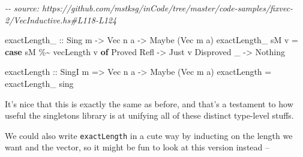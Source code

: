\documentclass[]{article}
\newenvironment{Shaded}{}{}
\newcommand{\CommentTok}[1]{\textcolor[rgb]{0.38,0.63,0.69}{\textit{#1}}}
\newcommand{\DataTypeTok}[1]{\textcolor[rgb]{0.56,0.13,0.00}{#1}}
\newcommand{\KeywordTok}[1]{\textcolor[rgb]{0.00,0.44,0.13}{\textbf{#1}}}
\newcommand{\NormalTok}[1]{#1}
\newcommand{\OperatorTok}[1]{\textcolor[rgb]{0.40,0.40,0.40}{#1}}
\newcommand{\OtherTok}[1]{\textcolor[rgb]{0.00,0.44,0.13}{#1}}
\begin{document}
\begin{Shaded}
\begin{Highlighting}[]
\CommentTok{{-}{-} source: https://github.com/mstksg/inCode/tree/master/code{-}samples/fixvec{-}2/VecInductive.hs\#L118{-}L124}

\OtherTok{exactLength\_ ::} \DataTypeTok{Sing}\NormalTok{ m }\OtherTok{{-}\textgreater{}} \DataTypeTok{Vec}\NormalTok{ n a }\OtherTok{{-}\textgreater{}} \DataTypeTok{Maybe}\NormalTok{ (}\DataTypeTok{Vec}\NormalTok{ m a)}
\NormalTok{exactLength\_ sM v }\OtherTok{=} \KeywordTok{case}\NormalTok{ sM }\OperatorTok{\%\textasciitilde{}}\NormalTok{ vecLength v }\KeywordTok{of}
    \DataTypeTok{Proved} \DataTypeTok{Refl} \OtherTok{{-}\textgreater{}} \DataTypeTok{Just}\NormalTok{ v}
    \DataTypeTok{Disproved}\NormalTok{ \_ }\OtherTok{{-}\textgreater{}} \DataTypeTok{Nothing}

\OtherTok{exactLength ::} \DataTypeTok{SingI}\NormalTok{ m }\OtherTok{=\textgreater{}} \DataTypeTok{Vec}\NormalTok{ n a }\OtherTok{{-}\textgreater{}} \DataTypeTok{Maybe}\NormalTok{ (}\DataTypeTok{Vec}\NormalTok{ m a)}
\NormalTok{exactLength }\OtherTok{=}\NormalTok{ exactLength\_ sing}
\end{Highlighting}
\end{Shaded}

It's nice that this is exactly the same as before, and that's a testament to how
useful the singletons library is at unifying all of these distinct type-level
stuffs.

We could also write \texttt{exactLength} in a cute way by inducting on the
length we want and the vector, so it might be fun to look at this version
instead --
\end{document}

